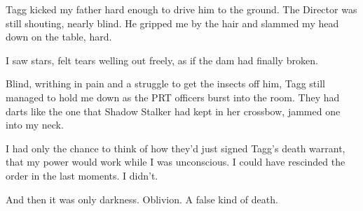 Tagg kicked my father hard enough to drive him to the ground.  The Director was still shouting, nearly blind.  He gripped me by the hair and slammed my head down on the table, hard.



I saw stars, felt tears welling out freely, as if the dam had finally broken.



Blind, writhing in pain and a struggle to get the insects off him, Tagg still managed to hold me down as the PRT officers burst into the room.  They had darts like the one that Shadow Stalker had kept in her crossbow, jammed one into my neck.



I had only the chance to think of how they'd just signed Tagg's death warrant, that my power would work while I was unconscious.  I could have rescinded the order in the last moments.  I didn't.



And then it was only darkness.  Oblivion.  A false kind of death.





